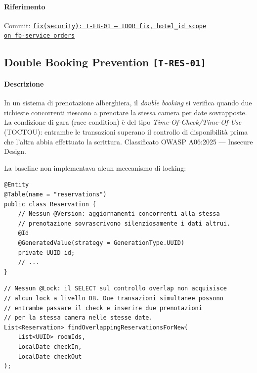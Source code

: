 ﻿\documentclass[a4paper,12pt]{report}
\newcommand{\commitref}[2]{\texttt{\small \href{https://github.com/diegoandruccioli/hotel-pms/commit/#1}{#2}}}
\newcommand{\threat}[1]{\texttt{\small\textcolor{vulnred}{[#1]}}}
\begin{document}
\paragraph{Riferimento} Commit: \commitref{18a3768}{fix(security): T-FB-01 --- IDOR fix, hotel\_id scope \\
on fb-service orders}

\subsection{Double Booking Prevention \threat{T-RES-01}}

\paragraph{Descrizione}
In un sistema di prenotazione alberghiera, il \emph{double booking} si verifica quando due
richieste concorrenti riescono a prenotare la stessa camera per date sovrapposte.
La condizione di gara (race condition) è del tipo \emph{Time-Of-Check/Time-Of-Use} (TOCTOU):
entrambe le transazioni superano il controllo di disponibilità prima che l'altra abbia
effettuato la scrittura. Classificato OWASP A06:2025 --- Insecure Design.

La baseline non implementava alcun meccanismo di locking:

\begin{insecurebox}[title={Codice Vulnerabile --- Reservation.java (baseline)}]
\begin{lstlisting}[style=java]
@Entity
@Table(name = "reservations")
public class Reservation {
    // Nessun @Version: aggiornamenti concorrenti alla stessa
    // prenotazione sovrascrivono silenziosamente i dati altrui.
    @Id
    @GeneratedValue(strategy = GenerationType.UUID)
    private UUID id;
    // ...
}
\end{lstlisting}
\end{insecurebox}

\begin{insecurebox}[title={Codice Vulnerabile --- ReservationRepository.java (baseline)}]
\begin{lstlisting}[style=java]
// Nessun @Lock: il SELECT sul controllo overlap non acquisisce
// alcun lock a livello DB. Due transazioni simultanee possono
// entrambe passare il check e inserire due prenotazioni
// per la stessa camera nelle stesse date.
List<Reservation> findOverlappingReservationsForNew(
    List<UUID> roomIds,
    LocalDate checkIn,
    LocalDate checkOut
);
\end{lstlisting}
\end{insecurebox}
\end{document}
